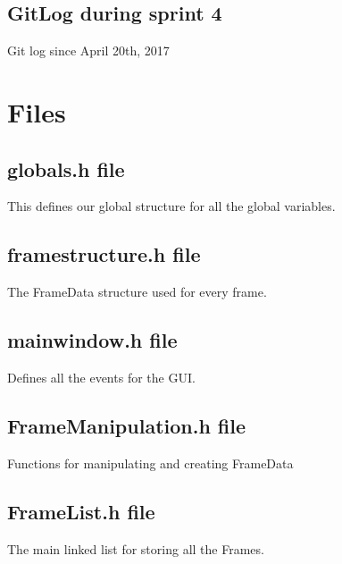 \documentclass[11pt]{article} %
\begin{document}
{\newpage
\subsection{GitLog during sprint 4}
Git log since April 20th, 2017



\newpage
\section{Files}
%

\subsection{globals.h file}
This defines our global structure for all the global variables.


\newpage
\subsection{framestructure.h file}
The FrameData structure used for every frame.


\newpage
\subsection{mainwindow.h file}
Defines all the events for the GUI.



\newpage
\subsection{FrameManipulation.h file}
Functions for manipulating and creating FrameData

%

\newpage
\subsection{FrameList.h file}
The main linked list for storing all the Frames.

%

}
\end{document}
